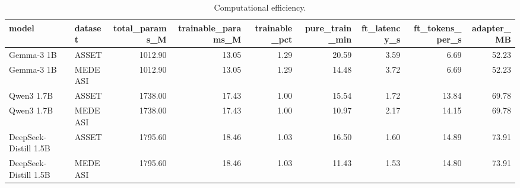 \begin{table}
\caption{Computational efficiency.}
\label{tab:efficiency}
\begin{tabular}{llrrrrrrr}
\toprule
model & dataset & total_params_M & trainable_params_M & trainable_pct & pure_train_min & ft_latency_s & ft_tokens_per_s & adapter_MB \\
\midrule
Gemma-3 1B & ASSET & 1012.90 & 13.05 & 1.29 & 20.59 & 3.59 & 6.69 & 52.23 \\
Gemma-3 1B & MEDEASI & 1012.90 & 13.05 & 1.29 & 14.48 & 3.72 & 6.69 & 52.23 \\
Qwen3 1.7B & ASSET & 1738.00 & 17.43 & 1.00 & 15.54 & 1.72 & 13.84 & 69.78 \\
Qwen3 1.7B & MEDEASI & 1738.00 & 17.43 & 1.00 & 10.97 & 2.17 & 14.15 & 69.78 \\
DeepSeek-Distill 1.5B & ASSET & 1795.60 & 18.46 & 1.03 & 16.50 & 1.60 & 14.89 & 73.91 \\
DeepSeek-Distill 1.5B & MEDEASI & 1795.60 & 18.46 & 1.03 & 11.43 & 1.53 & 14.80 & 73.91 \\
\bottomrule
\end{tabular}
\end{table}
